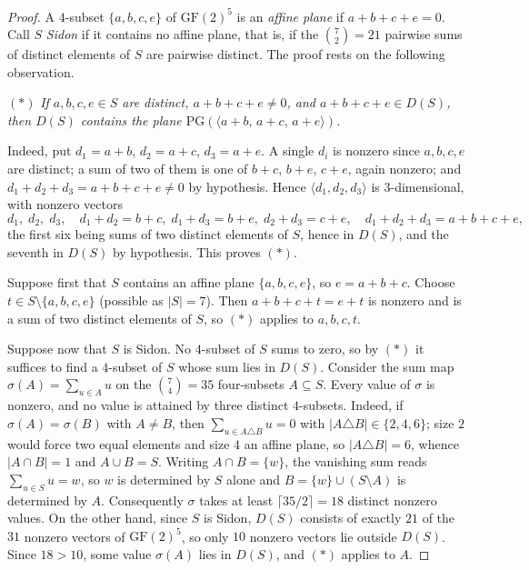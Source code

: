 \documentclass[12pt]{article}
\theoremstyle{definition}
\numberwithin{equation}{section}
\newcommand{\GF}[1]{\mathrm{GF}(#1)}
\newcommand{\PGv}[1]{\mathrm{PG}(#1)}
\begin{document}
\begin{proof}
A $4$-subset $\{a,b,c,e\}$ of $\GF2^5$ is an \textit{affine plane} if $a+b+c+e=0$. Call $S$ \textit{Sidon} if it contains no affine plane, that is, if the $\binom72=21$ pairwise sums of distinct elements of $S$ are pairwise distinct.  The proof rests on the following observation.

\smallskip
\noindent$(\ast)$ \textit{If $a,b,c,e\in S$ are distinct, $a+b+c+e\neq0$, and $a+b+c+e\in D(S)$, then $D(S)$ contains the plane $\PGv{\langle a+b,\,a+c,\,a+e\rangle}$.}

\smallskip
Indeed, put $d_1=a+b$, $d_2=a+c$, $d_3=a+e$.  A single $d_i$ is nonzero since $a,b,c,e$ are distinct; a sum of two of them is one of $b+c$, $b+e$, $c+e$, again nonzero; and $d_1+d_2+d_3=a+b+c+e\neq0$ by hypothesis.  Hence $\langle d_1,d_2,d_3\rangle$ is $3$-dimensional, with nonzero vectors 
\[
d_1,\; d_2,\; d_3,\quad d_1+d_2=b+c,\; d_1+d_3=b+e,\; d_2+d_3=c+e,\quad d_1+d_2+d_3=a+b+c+e,
\]
the first six being sums of two distinct elements of $S$, hence in $D(S)$, and the seventh in $D(S)$ by hypothesis.  This proves $(\ast)$.

\smallskip
Suppose first that $S$ contains an affine plane $\{a,b,c,e\}$, so $e=a+b+c$.  Choose $t\in S\setminus\{a,b,c,e\}$ (possible as $|S|=7$). Then $a+b+c+t=e+t$ is nonzero and is a sum of two distinct elements of $S$, so $(\ast)$ applies to $a,b,c,t$.

Suppose now that $S$ is Sidon.  No $4$-subset of $S$ sums to zero, so by $(\ast)$ it suffices to find a $4$-subset of $S$ whose sum lies in $D(S)$.  Consider the sum map $\sigma(A)=\sum_{u\in A}u$ on the $\binom74=35$ four-subsets $A\subseteq S$.  Every value of $\sigma$ is nonzero, and no value is attained by three distinct $4$-subsets. Indeed, if $\sigma(A)=\sigma(B)$ with $A\neq B$, then $\sum_{u\in A\triangle B}u=0$ with $|A\triangle B|\in\{2,4,6\}$; size $2$ would force two equal elements and size $4$ an affine plane, so $|A\triangle B|=6$, whence $|A\cap B|=1$ and $A\cup B=S$. Writing $A\cap B=\{w\}$, the vanishing sum reads $\sum_{u\in S}u=w$, so $w$ is determined by $S$ alone and $B=\{w\}\cup(S\setminus A)$ is determined by $A$.  Consequently $\sigma$ takes at least $\lceil35/2\rceil=18$ distinct nonzero values.  On the other hand, since $S$ is Sidon, $D(S)$ consists of exactly $21$ of the $31$ nonzero vectors of $\GF2^5$, so only $10$ nonzero vectors lie outside $D(S)$.  Since $18>10$, some value $\sigma(A)$ lies in $D(S)$, and $(\ast)$ applies to $A$.
\end{proof}
\end{document}
